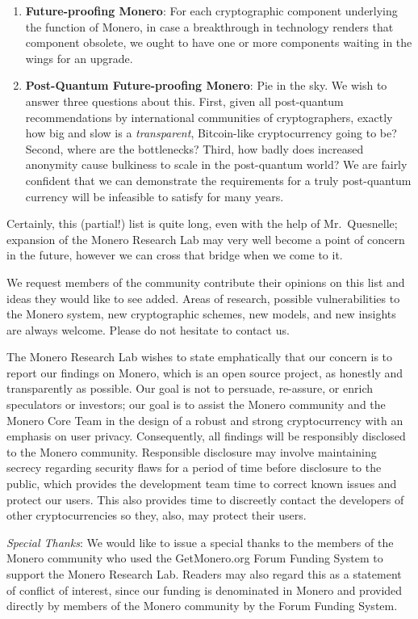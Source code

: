 \documentclass[12pt,english]{mrl}
\theoremstyle{definition}
\numberwithin{equation}{section}
\numberwithin{figure}{section}
\numberwithin{equation}{section}
\numberwithin{equation}{section}
\numberwithin{figure}{section}
\begin{document}
\begin{enumerate}[1.]
    \item \textbf{Future-proofing Monero}: For each cryptographic component underlying the function of Monero, in case a breakthrough in technology renders that component obsolete, we ought to have one or more components waiting in the wings for an upgrade.
    
    \item \textbf{Post-Quantum Future-proofing Monero}: Pie in the sky. We wish to answer three questions about this. First, given all post-quantum recommendations by international communities of cryptographers, exactly how big and slow is a \textit{transparent}, Bitcoin-like cryptocurrency going to be? Second, where are the bottlenecks? Third, how badly does increased anonymity cause bulkiness to scale in the post-quantum world? We are fairly confident that we can demonstrate the requirements for a truly post-quantum currency will be infeasible to satisfy for many years.
    
    
    
    
    
\end{enumerate}


Certainly, this (partial!) list is quite long, even with the help of Mr.\ Quesnelle; expansion of the Monero Research Lab may very well become a point of concern in the future, however we can cross that bridge when we come to it. 

We request members of the community contribute their opinions on this list and ideas they would like to see added. Areas of research, possible vulnerabilities to the Monero system, new cryptographic schemes, new models, and new insights are always welcome. Please do not hesitate to contact us.  

The Monero Research Lab wishes to state emphatically that our concern is to report our findings on Monero, which is an open source project, as honestly and transparently as possible. Our goal is not to persuade, re-assure, or enrich speculators or investors; our goal is to assist the Monero community and the Monero Core Team in the design of a robust and strong cryptocurrency with an emphasis on user privacy.  Consequently, all findings will be responsibly disclosed to the Monero community. Responsible disclosure may involve maintaining secrecy regarding security flaws for a period of time before disclosure to the public, which provides the development team time to correct known issues and protect our users. This also provides time to discreetly contact the developers of other cryptocurrencies so they, also, may protect their users.




\emph{Special Thanks}: We would like to issue a special thanks to the members of the Monero community who used the GetMonero.org Forum Funding System to support the Monero Research Lab. Readers may also regard this as a statement of conflict of interest, since our funding is denominated in Monero and provided directly by members of the Monero community by the Forum Funding System.

\medskip{}



\end{document}
